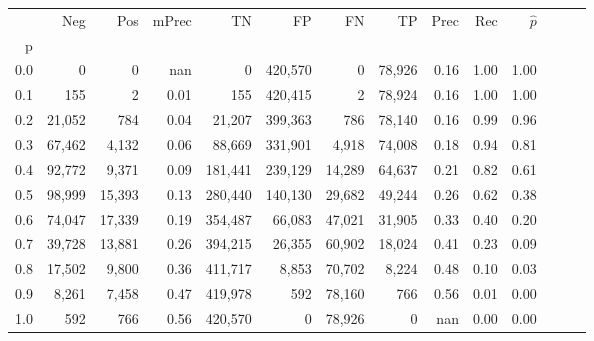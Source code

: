 \begin{tabular}{rrrrrrrrrrrrrr}
\toprule
{} &     Neg &     Pos & mPrec &       TN &       FP &      FN &      TP &  Prec &   Rec & $\hat{p}$ \\
p   &         &         &       &          &          &         &         &       &       &           \\
\midrule
0.0 &       0 &       0 &   nan &        0 &  420,570 &       0 &  78,926 &  0.16 &  1.00 &      1.00 \\
0.1 &     155 &       2 &  0.01 &      155 &  420,415 &       2 &  78,924 &  0.16 &  1.00 &      1.00 \\
0.2 &  21,052 &     784 &  0.04 &   21,207 &  399,363 &     786 &  78,140 &  0.16 &  0.99 &      0.96 \\
0.3 &  67,462 &   4,132 &  0.06 &   88,669 &  331,901 &   4,918 &  74,008 &  0.18 &  0.94 &      0.81 \\
0.4 &  92,772 &   9,371 &  0.09 &  181,441 &  239,129 &  14,289 &  64,637 &  0.21 &  0.82 &      0.61 \\
0.5 &  98,999 &  15,393 &  0.13 &  280,440 &  140,130 &  29,682 &  49,244 &  0.26 &  0.62 &      0.38 \\
0.6 &  74,047 &  17,339 &  0.19 &  354,487 &   66,083 &  47,021 &  31,905 &  0.33 &  0.40 &      0.20 \\
0.7 &  39,728 &  13,881 &  0.26 &  394,215 &   26,355 &  60,902 &  18,024 &  0.41 &  0.23 &      0.09 \\
0.8 &  17,502 &   9,800 &  0.36 &  411,717 &    8,853 &  70,702 &   8,224 &  0.48 &  0.10 &      0.03 \\
0.9 &   8,261 &   7,458 &  0.47 &  419,978 &      592 &  78,160 &     766 &  0.56 &  0.01 &      0.00 \\
1.0 &     592 &     766 &  0.56 &  420,570 &        0 &  78,926 &       0 &   nan &  0.00 &      0.00 \\
\bottomrule
\end{tabular}
